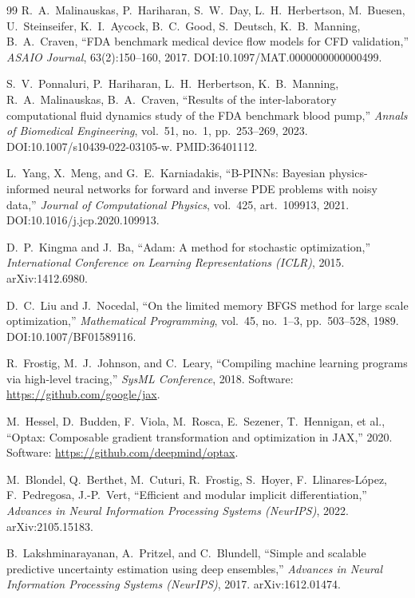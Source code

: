 \documentclass[12pt,a4paper]{article}
\begin{document}
\begin{thebibliography}{99}
R.~A.~Malinauskas, P.~Hariharan, S.~W.~Day, L.~H.~Herbertson,
M.~Buesen, U.~Steinseifer, K.~I.~Aycock, B.~C.~Good, S.~Deutsch,
K.~B.~Manning, B.~A.~Craven,
``FDA benchmark medical device flow models for CFD validation,''
\textit{ASAIO Journal}, 63(2):150--160, 2017.
DOI:10.1097/MAT.0000000000000499.

S.~V.~Ponnaluri, P.~Hariharan, L.~H.~Herbertson, K.~B.~Manning,
R.~A.~Malinauskas, B.~A.~Craven,
``Results of the inter-laboratory computational fluid dynamics
study of the FDA benchmark blood pump,''
\textit{Annals of Biomedical Engineering}, vol.~51, no.~1,
pp.~253--269, 2023. DOI:10.1007/s10439-022-03105-w.
PMID:36401112.

L.~Yang, X.~Meng, and G.~E.~Karniadakis,
``B-PINNs: Bayesian physics-informed neural networks for forward
and inverse PDE problems with noisy data,''
\textit{Journal of Computational Physics}, vol.~425,
art.~109913, 2021. DOI:10.1016/j.jcp.2020.109913.

D.~P.~Kingma and J.~Ba,
``Adam: A method for stochastic optimization,''
\textit{International Conference on Learning Representations
(ICLR)}, 2015. arXiv:1412.6980.

D.~C.~Liu and J.~Nocedal,
``On the limited memory BFGS method for large scale optimization,''
\textit{Mathematical Programming}, vol.~45, no.~1--3, pp.~503--528,
1989. DOI:10.1007/BF01589116.

R.~Frostig, M.~J.~Johnson, and C.~Leary,
``Compiling machine learning programs via high-level tracing,''
\textit{SysML Conference}, 2018.
Software: \url{https://github.com/google/jax}.

M.~Hessel, D.~Budden, F.~Viola, M.~Rosca, E.~Sezener, T.~Hennigan,
et al.,
``Optax: Composable gradient transformation and optimization in
JAX,'' 2020.
Software: \url{https://github.com/deepmind/optax}.

M.~Blondel, Q.~Berthet, M.~Cuturi, R.~Frostig, S.~Hoyer,
F.~Llinares-L\'opez, F.~Pedregosa, J.-P.~Vert,
``Efficient and modular implicit differentiation,''
\textit{Advances in Neural Information Processing Systems (NeurIPS)},
2022. arXiv:2105.15183.

B.~Lakshminarayanan, A.~Pritzel, and C.~Blundell,
``Simple and scalable predictive uncertainty estimation using deep
ensembles,''
\textit{Advances in Neural Information Processing Systems (NeurIPS)},
2017. arXiv:1612.01474.

\end{thebibliography}
\end{document}
